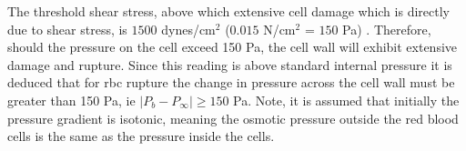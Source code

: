 The threshold shear stress, above which extensive cell damage which is directly due to shear stress, is $1500$ dynes/cm$^2$ ($0.015$ N/cm$^2$ = $150$ Pa) \cite{Leverett1972}. Therefore, should the pressure on the cell exceed 150 Pa, the cell wall will exhibit extensive damage and rupture. Since this reading is above standard internal pressure it is deduced that for \ac{rbc} rupture the change in pressure across the cell wall must be greater than 150 Pa, ie $|P_b - P_{\infty}  | \geq 150 $ Pa. Note, it is assumed that initially the pressure gradient is isotonic, meaning the osmotic pressure outside the red blood cells is the same as the pressure inside the cells.

